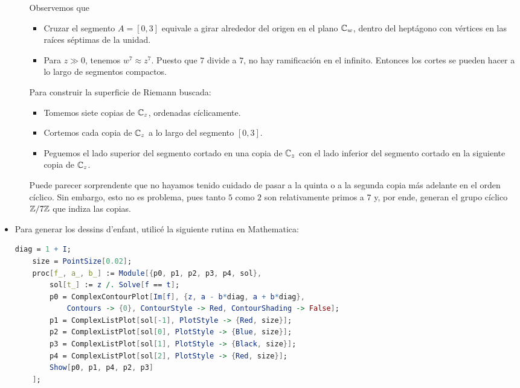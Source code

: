 \begin{solution}
\begin{itemize}
\begin{enumerate}[label=\alph*)]
        Observemos que
        \begin{itemize}
            \item Cruzar el segmento $A = [0, 3]$ equivale a girar alrededor del origen en el plano $\mathbb C_w$, dentro del heptágono con vértices en las raíces séptimas de la unidad.
            
            \item Para $z \gg 0$, tenemos $w^7 \approx z^7$. Puesto que $7$ divide a $7$, no hay ramificación en el infinito. Entonces los cortes se pueden hacer a lo largo de segmentos compactos.
        \end{itemize}
        
        Para construir la superficie de Riemann buscada:
        \begin{itemize}
            \item Tomemos siete copias de $\mathbb C_z$, ordenadas cíclicamente.
            \item Cortemos cada copia de $\mathbb C_z$ a lo largo del segmento $[0, 3]$.
            \item Peguemos el lado superior del segmento cortado en una copia de $\mathbb C_z$ con el lado inferior del segmento cortado en la siguiente copia de $\mathbb C_z$.
        \end{itemize}
        
        Puede parecer sorprendente que no hayamos tenido cuidado de pasar a la quinta o a la segunda copia más adelante en el orden cíclico. Sin embargo, esto no es problema, pues tanto $5$ como $2$ son relativamente primos a $7$ y, por ende, generan el grupo cíclico $\mathbb Z / 7\mathbb Z$ que indiza las copias.
    \end{enumerate}
    
    \item Para generar los dessins d'enfant, utilicé la siguiente rutina en Mathematica:
    \begin{lstlisting}[language=Mathematica]
    diag = 1 + I;
    size = PointSize[0.02];
    proc[f_, a_, b_] := Module[{p0, p1, p2, p3, p4, sol},
        sol[t_] := z /. Solve[f == t];
        p0 = ComplexContourPlot[Im[f], {z, a - b*diag, a + b*diag},
            Contours -> {0}, ContourStyle -> Red, ContourShading -> False];
        p1 = ComplexListPlot[sol[-1], PlotStyle -> {Red, size}];
        p2 = ComplexListPlot[sol[0], PlotStyle -> {Blue, size}];
        p3 = ComplexListPlot[sol[1], PlotStyle -> {Black, size}];
        p4 = ComplexListPlot[sol[2], PlotStyle -> {Red, size}];
        Show[p0, p1, p4, p2, p3]
    ];
    \end{lstlisting}
    

\end{itemize}
\end{solution}
